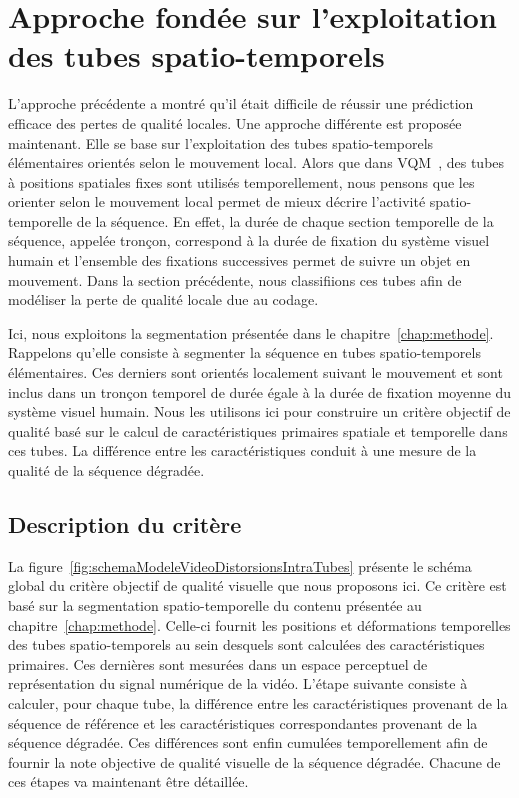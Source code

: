 \section{Approche fondée sur l'exploitation des tubes spatio-temporels}
L'approche précédente a montré qu'il était difficile de réussir une prédiction efficace des pertes de qualité locales. Une approche différente est proposée maintenant. Elle se base sur l'exploitation des tubes spatio-temporels élémentaires orientés selon le mouvement local. Alors que dans VQM~\cite{wolf-vqmtech}, des tubes à positions spatiales fixes sont utilisés temporellement, nous pensons que les orienter selon le mouvement local permet de mieux décrire l'activité spatio-temporelle de la séquence. En effet, la durée de chaque section temporelle de la séquence, appelée tronçon, correspond à la durée de fixation du système visuel humain et l'ensemble des fixations successives permet de suivre un objet en mouvement. Dans la section précédente, nous classifiions ces tubes afin de modéliser la perte de qualité locale due au codage.

Ici, nous exploitons la segmentation présentée dans le chapitre~\ref{chap:methode}. Rappelons qu'elle consiste à segmenter la séquence en tubes spatio-temporels élémentaires. Ces derniers sont orientés localement suivant le mouvement et sont inclus dans un tronçon temporel de durée égale à la durée de fixation moyenne du système visuel humain. Nous les utilisons ici pour construire un critère objectif de qualité basé sur le calcul de caractéristiques primaires spatiale et temporelle dans ces tubes. La différence entre les caractéristiques conduit à une mesure de la qualité de la séquence dégradée.


\subsection{Description du critère}
La figure~\ref{fig:schemaModeleVideoDistorsionsIntraTubes} présente le schéma global du critère objectif de qualité visuelle que nous proposons ici. Ce critère est basé sur la segmentation spatio-temporelle du contenu présentée au chapitre~\ref{chap:methode}. Celle-ci fournit les positions et déformations temporelles des tubes spatio-temporels au sein desquels sont calculées des caractéristiques primaires. Ces dernières sont mesurées dans un espace perceptuel de représentation du signal numérique de la vidéo. L'étape suivante consiste à calculer, pour chaque tube, la différence entre les caractéristiques provenant de la séquence de référence et les caractéristiques correspondantes provenant de la séquence dégradée. Ces différences sont enfin cumulées temporellement afin de fournir la note objective de qualité visuelle de la séquence dégradée. Chacune de ces étapes va maintenant être détaillée.

